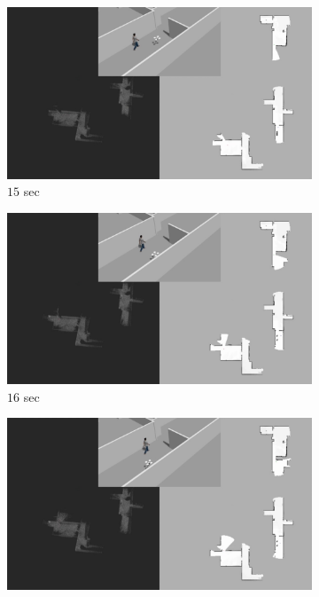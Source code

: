 \documentclass[smallextended]{svjour3}       %
\begin{document}
\begin{figure}[!t]
\centering
    	\begin{subfigure}[t]{0.3\columnwidth}
           	\centering
          	\includegraphics[trim={22cm 25cm 20cm 0cm}, clip, width=\textwidth]{evade_15sec.jpg}
        		\caption{$15$ sec}
    	\end{subfigure}
	\hspace*{0.02\textwidth}
    	\begin{subfigure}[t]{0.3\columnwidth}
           	\centering
          	\includegraphics[trim={22cm 25cm 20cm 0cm}, clip, width=\textwidth]{evade_16sec.jpg}
        		\caption{$16$ sec}
    	\end{subfigure}
	\hspace*{0.02\textwidth}
    	\begin{subfigure}[t]{0.3\columnwidth}
           	\centering
          	\includegraphics[trim={22cm 25cm 20cm 0cm}, clip, width=\textwidth]{evade_17sec.jpg}

\end{subfigure}
\end{figure}
\end{document}
